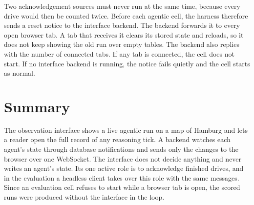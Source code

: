 Two acknowledgement sources must never run at the same time, because every
drive would then be counted twice. Before each agentic cell, the harness
therefore sends a reset notice to the interface backend. The backend forwards
it to every open browser tab. A tab that receives it clears its stored state
and reloads, so it does not keep showing the old run over empty tables. The
backend also replies with the number of connected tabs. If any tab is
connected, the cell does not start. If no interface backend is running, the
notice fails quietly and the cell starts as normal.

\section{Summary}
\label{sec:ui:summary}

The observation interface shows a live agentic run on a map of Hamburg and
lets a reader open the full record of any reasoning tick. A backend watches
each agent's state through database notifications and sends only the changes
to the browser over one WebSocket. The interface does not decide anything and
never writes an agent's state. Its one active role is to acknowledge finished
drives, and in the evaluation a headless client takes over this role with the
same messages. Since an evaluation cell refuses to start while a browser tab is open, the
scored runs were produced without the interface in the loop.
